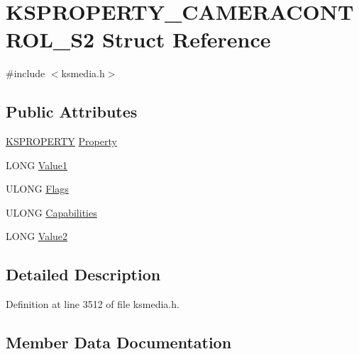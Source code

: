 \hypertarget{struct_k_s_p_r_o_p_e_r_t_y___c_a_m_e_r_a_c_o_n_t_r_o_l___s2}{}\section{K\+S\+P\+R\+O\+P\+E\+R\+T\+Y\+\_\+\+C\+A\+M\+E\+R\+A\+C\+O\+N\+T\+R\+O\+L\+\_\+\+S2 Struct Reference}
\label{struct_k_s_p_r_o_p_e_r_t_y___c_a_m_e_r_a_c_o_n_t_r_o_l___s2}


{\ttfamily \#include $<$ksmedia.\+h$>$}

\subsection*{Public Attributes}
\begin{DoxyCompactItemize}
\item 
\hyperlink{ks_8h_a4392f77c74e868d813d46c39ada4d660}{K\+S\+P\+R\+O\+P\+E\+R\+TY} \hyperlink{struct_k_s_p_r_o_p_e_r_t_y___c_a_m_e_r_a_c_o_n_t_r_o_l___s2_ababcbf9e0d2b7cffa22a9dbde88b12d5}{Property}
\item 
L\+O\+NG \hyperlink{struct_k_s_p_r_o_p_e_r_t_y___c_a_m_e_r_a_c_o_n_t_r_o_l___s2_a821cd27217194fe95194150913f2a472}{Value1}
\item 
U\+L\+O\+NG \hyperlink{struct_k_s_p_r_o_p_e_r_t_y___c_a_m_e_r_a_c_o_n_t_r_o_l___s2_a72aa938a137bca971072ee9b56839c8f}{Flags}
\item 
U\+L\+O\+NG \hyperlink{struct_k_s_p_r_o_p_e_r_t_y___c_a_m_e_r_a_c_o_n_t_r_o_l___s2_a698e827316285e220d57f3e3616d17cf}{Capabilities}
\item 
L\+O\+NG \hyperlink{struct_k_s_p_r_o_p_e_r_t_y___c_a_m_e_r_a_c_o_n_t_r_o_l___s2_a659743c8a0979d68f3cec32ff5213eed}{Value2}
\end{DoxyCompactItemize}


\subsection{Detailed Description}


Definition at line 3512 of file ksmedia.\+h.



\subsection{Member Data Documentation}
